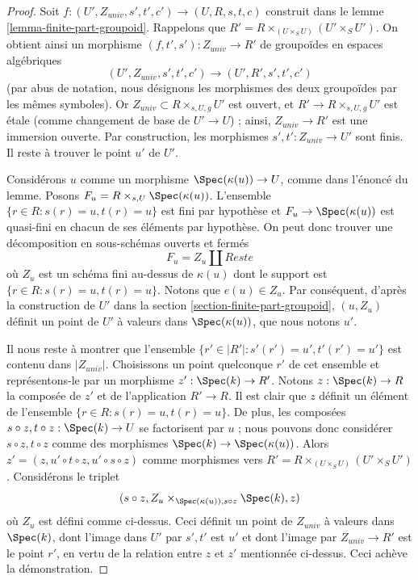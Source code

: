 \begin{proof}
Soit $f : (U', Z_{univ}, s', t', c') \to (U, R, s, t, c)$ construit dans le
lemme \ref{lemma-finite-part-groupoid}.
Rappelons que $R' = R \times_{(U \times_S U)} (U' \times_S U')$.
On obtient ainsi un morphisme $(f, t', s') : Z_{univ} \to R'$ de groupoïdes
en espaces algébriques
$$
(U', Z_{univ}, s', t', c') \to (U', R', s', t', c')
$$
(par abus de notation, nous désignons les morphismes des deux groupoïdes
par les mêmes symboles). Or $Z_{univ} \subset R \times_{s, U, g} U'$ est ouvert,
et $R' \to R \times_{s, U, g} U'$ est \'etale (comme changement de base
de $U' \to U$) ; ainsi, $Z_{univ} \to R'$ est une immersion ouverte.
Par construction, les morphismes $s', t' : Z_{univ} \to U'$ sont finis.
Il reste à trouver le point $u'$ de $U'$.

\medskip\noindent
Considérons $u$ comme un morphisme $\Spec(\kappa(u)) \to U$, comme dans
l'énoncé du lemme. Posons $F_u = R \times_{s, U} \Spec(\kappa(u))$.
L'ensemble $\{r \in R : s(r) = u, t(r) = u\}$ est fini par hypothèse
et $F_u \to \Spec(\kappa(u))$ est quasi-fini en chacun
de ses éléments par hypothèse. On peut donc trouver une décomposition en
sous-schémas ouverts et fermés
$$
F_u = Z_u \amalg Reste
$$
où $Z_u$ est un schéma fini au-dessus de $\kappa(u)$ dont le support est
$\{r \in R : s(r) = u, t(r) = u\}$. Notons que $e(u) \in Z_u$.
Par conséquent, d'après la construction de $U'$ dans la
section \ref{section-finite-part-groupoid},
$(u, Z_u)$ définit un point de $U'$ à valeurs dans
$\Spec(\kappa(u))$, que nous notons $u'$.

\medskip\noindent
Il nous reste à montrer que l'ensemble
$\{r' \in |R'| : s'(r') = u', t'(r') = u'\}$
est contenu dans $|Z_{univ}|$.
Choisissons un point quelconque $r'$ de cet ensemble et représentons-le par
un morphisme $z' : \Spec(k) \to R'$. Notons $z : \Spec(k) \to R$
la composée de $z'$ et de l'application $R' \to R$.
Il est clair que $z$ définit un élément de l'ensemble
$\{r \in R : s(r) = u, t(r) = u\}$.
De plus, les composées $s \circ z, t \circ z : \Spec(k) \to U$
se factorisent par $u$ ; nous pouvons donc considérer $s \circ z, t \circ z$
comme des morphismes $\Spec(k) \to \Spec(\kappa(u))$. Alors
$z' = (z, u' \circ t \circ z, u'\circ s \circ z)$ comme morphismes vers
$R' = R \times_{(U \times_S U)} (U' \times_S U')$.
Considérons le triplet
$$
(s \circ z, Z_u \times_{\Spec(\kappa(u)), s \circ z} \Spec(k), z)
$$
où $Z_u$ est défini comme ci-dessus. Ceci définit un point de $Z_{univ}$
à valeurs dans $\Spec(k)$, dont l'image dans $U'$ par $s', t'$ est $u'$ et
dont l'image par
$Z_{univ} \to R'$ est le point $r'$, en vertu de la relation entre
$z$ et $z'$ mentionnée ci-dessus.
Ceci achève la démonstration.
\end{proof}

